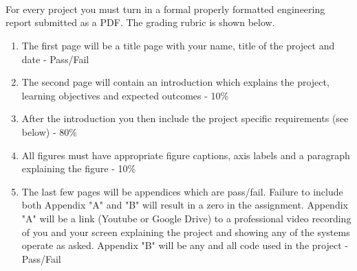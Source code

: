 \ \\
\ \\
\ \\
\noindent For every project you must turn in a formal properly formatted engineering report submitted as a PDF. The grading rubric is shown below.

\begin{enumerate}[itemsep=-5pt]
\item The first page will be a title page with your name, title of the project and date - Pass/Fail 	
\item The second page will contain an introduction which explains the project, learning objectives and expected outcomes - 10\%
\item After the introduction you then include the project specific requirements (see below) - 80\%
\item All figures must have appropriate figure captions, axis labels and a paragraph explaining the figure - 10\%
\item The last few pages will be appendices which are pass/fail. Failure to include both Appendix "A" and "B" will result in a zero in the assignment. Appendix "A" will be a link (Youtube or Google Drive) to a professional video recording of you and your screen explaining the project and showing any of the systems operate as asked. Appendix "B" will be any and all code used in the project - Pass/Fail
\end{enumerate}

